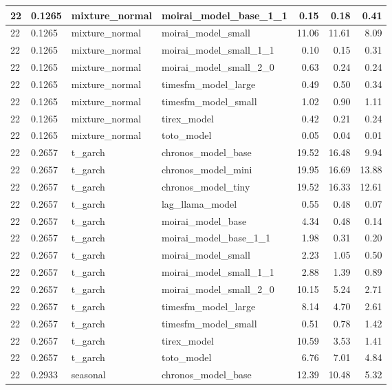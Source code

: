{\begin{tabular}{llllrrr}
\midrule
22 & 0.1265 & mixture\_normal & moirai\_model\_base\_1\_1 & 0.15 & 0.18 & 0.41 \\
\midrule
22 & 0.1265 & mixture\_normal & moirai\_model\_small & 11.06 & 11.61 & 8.09 \\
\midrule
22 & 0.1265 & mixture\_normal & moirai\_model\_small\_1\_1 & 0.10 & 0.15 & 0.31 \\
\midrule
22 & 0.1265 & mixture\_normal & moirai\_model\_small\_2\_0 & 0.63 & 0.24 & 0.24 \\
\midrule
22 & 0.1265 & mixture\_normal & timesfm\_model\_large & 0.49 & 0.50 & 0.34 \\
\midrule
22 & 0.1265 & mixture\_normal & timesfm\_model\_small & 1.02 & 0.90 & 1.11 \\
\midrule
22 & 0.1265 & mixture\_normal & tirex\_model & 0.42 & 0.21 & 0.24 \\
\midrule
22 & 0.1265 & mixture\_normal & toto\_model & 0.05 & 0.04 & 0.01 \\
\midrule
22 & 0.2657 & t\_garch & chronos\_model\_base & 19.52 & 16.48 & 9.94 \\
\midrule
22 & 0.2657 & t\_garch & chronos\_model\_mini & 19.95 & 16.69 & 13.88 \\
\midrule
22 & 0.2657 & t\_garch & chronos\_model\_tiny & 19.52 & 16.33 & 12.61 \\
\midrule
22 & 0.2657 & t\_garch & lag\_llama\_model & 0.55 & 0.48 & 0.07 \\
\midrule
22 & 0.2657 & t\_garch & moirai\_model\_base & 4.34 & 0.48 & 0.14 \\
\midrule
22 & 0.2657 & t\_garch & moirai\_model\_base\_1\_1 & 1.98 & 0.31 & 0.20 \\
\midrule
22 & 0.2657 & t\_garch & moirai\_model\_small & 2.23 & 1.05 & 0.50 \\
\midrule
22 & 0.2657 & t\_garch & moirai\_model\_small\_1\_1 & 2.88 & 1.39 & 0.89 \\
\midrule
22 & 0.2657 & t\_garch & moirai\_model\_small\_2\_0 & 10.15 & 5.24 & 2.71 \\
\midrule
22 & 0.2657 & t\_garch & timesfm\_model\_large & 8.14 & 4.70 & 2.61 \\
\midrule
22 & 0.2657 & t\_garch & timesfm\_model\_small & 0.51 & 0.78 & 1.42 \\
\midrule
22 & 0.2657 & t\_garch & tirex\_model & 10.59 & 3.53 & 1.41 \\
\midrule
22 & 0.2657 & t\_garch & toto\_model & 6.76 & 7.01 & 4.84 \\
\midrule
22 & 0.2933 & seasonal & chronos\_model\_base & 12.39 & 10.48 & 5.32 \\

\end{tabular}}
